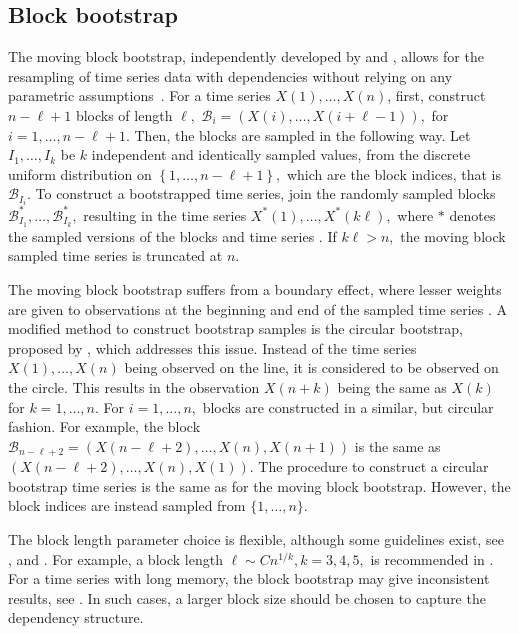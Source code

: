 \subsection{Block bootstrap}

The moving block bootstrap, independently developed by \cite{Kunsch1989} and \cite{Liu1992}, allows for the resampling of time series data with dependencies without relying on any parametric assumptions~\citep[Chapter~2.5]{Lahiri2003}.
For a time series \(X(1), \dots , X(n)\), first, construct \(n - \ell + 1\) blocks of length \(\ell,\)
\(\mathcal{B}_{i} = \left( X(i), \dots , X(i + \ell - 1) \right), \) for \(i = 1, \dots , n - \ell + 1.\)
Then, the blocks are sampled in the following way.
Let \(I_{1}, \dots, I_{k}\) be \(k\) independent and identically sampled values, from the discrete uniform distribution on \(\left\{ 1,\dots, n - \ell + 1 \right\},\) which are the block indices, that is \(\mathcal{B}_{I_{i}}.\)
To construct a bootstrapped time series, join the randomly sampled blocks \(\mathcal{B}_{I_{1}}^{*}, \dots, \mathcal{B}_{I_{k}}^{*},\) resulting in the time series \(X^{*}(1), \dots, X^{*}(k\ell),\) where \(*\) denotes the sampled versions of the blocks and time series \cite[Chapter~2.5]{Lahiri2003}. If $k\ell>n,$ the moving block sampled time series is truncated at $n.$

The moving block bootstrap suffers from a boundary effect, where lesser weights are given to observations at the beginning and end of the sampled time series \citep[Chapter~2.7]{Lahiri2003}. 
A modified method to construct bootstrap samples is the circular bootstrap, proposed by \cite{Politis1992}, which addresses this issue.
Instead of the time series \(X(1) , \dots , X(n)\) being observed on the line, it is considered to be observed on the circle. This results in the observation \(X(n + k)\) being the same as \(X(k)\) for \(k = 1, \dots , n.\)
 For \(i = 1, \dots , n ,\) blocks are constructed in a similar, but circular fashion. For example, the block \(\mathcal{B}_{n - \ell + 2} = \left(X(n - \ell + 2) , \dots , X(n), X(n + 1) \right)\) is the same as \(\left(X(n - \ell + 2) , \dots , X(n), X(1) \right) .\)
The procedure to construct a circular bootstrap time series is the same as for the moving block bootstrap.
However,  the block indices are instead sampled from \(\{1, \dots , n\}\).

The block length parameter choice is flexible, although some guidelines exist, see \cite{Hall1995}, \cite{Politis2004} and \cite{Arteche2024}. For example, a block length \(\ell \sim C n^{1/k}, k = 3, 4, 5,\) is recommended in \citep{Hall1995}.
For a time series with long memory, the block bootstrap may give inconsistent results, see \cite{Lahiri1993}.
In such cases, a larger block size should be chosen to capture the dependency structure.

